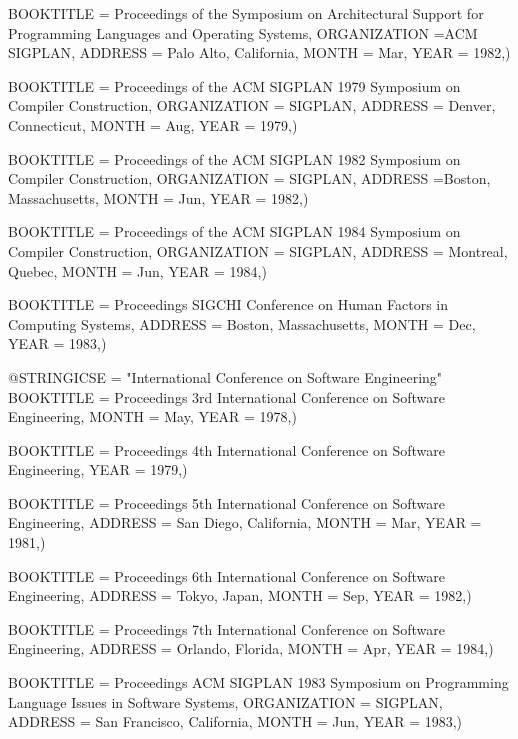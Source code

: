 		  


    BOOKTITLE = {Proceedings of the Symposium on Architectural Support for Programming Languages and Operating Systems},
    ORGANIZATION ={ACM SIGPLAN},
    ADDRESS = {Palo Alto, California},
    MONTH = Mar,
    YEAR = {1982},)

    BOOKTITLE = {Proceedings of the ACM SIGPLAN 1979 Symposium on Compiler Construction},
    ORGANIZATION = {SIGPLAN},
    ADDRESS = {Denver, Connecticut},
    MONTH = Aug,
    YEAR = {1979},)
    
    BOOKTITLE = {Proceedings of the ACM SIGPLAN 1982 Symposium on Compiler Construction},
    ORGANIZATION = {SIGPLAN},
    ADDRESS ={Boston, Massachusetts},
    MONTH = Jun,
    YEAR = {1982},)
    
    BOOKTITLE = {Proceedings of the ACM SIGPLAN 1984 Symposium on Compiler Construction},
    ORGANIZATION = {SIGPLAN},
    ADDRESS = {Montreal, Quebec},
    MONTH = Jun,
    YEAR = {1984},)

    BOOKTITLE = {Proceedings SIGCHI Conference on Human Factors in Computing Systems},
    ADDRESS = {Boston, Massachusetts},
    MONTH = Dec,
    YEAR = {1983},)

@STRING{ICSE = "International Conference on Software Engineering"}
    BOOKTITLE = {Proceedings 3rd International Conference on Software Engineering},
    MONTH = May,
    YEAR = {1978},)
    
    BOOKTITLE = {Proceedings 4th International Conference on Software Engineering},
    YEAR = {1979},)
    
    BOOKTITLE = {Proceedings 5th International Conference on Software Engineering},
    ADDRESS = {San Diego, California},
    MONTH = Mar,
    YEAR = {1981},)
    
    BOOKTITLE = {Proceedings 6th International Conference on Software Engineering},
    ADDRESS = {Tokyo, Japan},
    MONTH = Sep,
    YEAR = {1982},)
    
    BOOKTITLE = {Proceedings 7th International Conference on Software Engineering},
    ADDRESS = {Orlando, Florida},
    MONTH = Apr,
    YEAR = {1984},)

    BOOKTITLE = {Proceedings ACM SIGPLAN 1983 Symposium on Programming Language Issues in Software Systems},
    ORGANIZATION = {SIGPLAN},
    ADDRESS = {San Francisco, California},
    MONTH = Jun,
    YEAR = {1983},)

